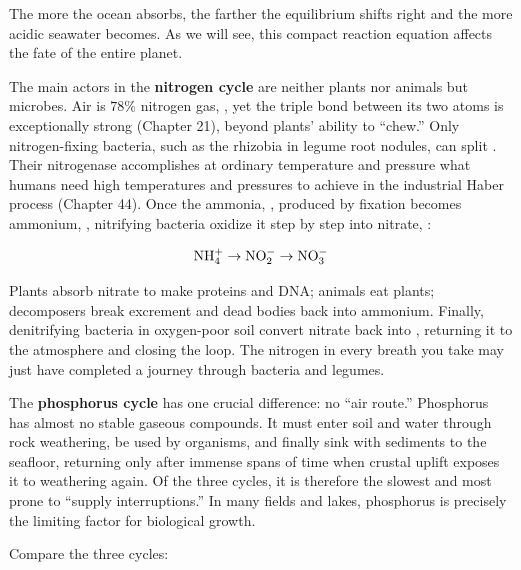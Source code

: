 The more  the ocean absorbs, the farther the equilibrium shifts right and the more acidic seawater becomes. As we will see, this compact reaction equation affects the fate of the entire planet.

The main actors in the \textbf{nitrogen cycle} are neither plants nor animals but microbes. Air is $78\%$ nitrogen gas, , yet the triple bond between its two atoms is exceptionally strong (Chapter 21), beyond plants' ability to ``chew.'' Only nitrogen-fixing bacteria, such as the rhizobia in legume root nodules, can split . Their nitrogenase accomplishes at ordinary temperature and pressure what humans need high temperatures and pressures to achieve in the industrial Haber process (Chapter 44). Once the ammonia, , produced by fixation becomes ammonium, , nitrifying bacteria oxidize it step by step into nitrate, :

\[\mathrm{NH_4^+} \rightarrow \mathrm{NO_2^-} \rightarrow \mathrm{NO_3^-}\]

Plants absorb nitrate to make proteins and DNA; animals eat plants; decomposers break excrement and dead bodies back into ammonium. Finally, denitrifying bacteria in oxygen-poor soil convert nitrate back into , returning it to the atmosphere and closing the loop. The nitrogen in every breath you take may just have completed a journey through bacteria and legumes.

The \textbf{phosphorus cycle} has one crucial difference: no ``air route.'' Phosphorus has almost no stable gaseous compounds. It must enter soil and water through rock weathering, be used by organisms, and finally sink with sediments to the seafloor, returning only after immense spans of time when crustal uplift exposes it to weathering again. Of the three cycles, it is therefore the slowest and most prone to ``supply interruptions.'' In many fields and lakes, phosphorus is precisely the limiting factor for biological growth.


Compare the three cycles:

